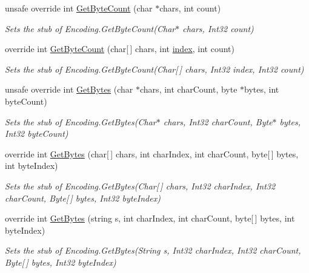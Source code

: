 \begin{DoxyCompactItemize}
unsafe override int \hyperlink{class_system_1_1_text_1_1_fakes_1_1_stub_encoding_a1a066dfd705dbee07eadc42558f04eb8}{Get\-Byte\-Count} (char $\ast$chars, int count)
\begin{DoxyCompactList}\small\item\em Sets the stub of Encoding.\-Get\-Byte\-Count(\-Char$\ast$ chars, Int32 count)\end{DoxyCompactList}\item 
override int \hyperlink{class_system_1_1_text_1_1_fakes_1_1_stub_encoding_a275fe54679a19c7c8ebd3a6cd57f48f8}{Get\-Byte\-Count} (char\mbox{[}$\,$\mbox{]} chars, int \hyperlink{jquery-1_810_82-vsdoc_8js_a75bb12d1f23302a9eea93a6d89d0193e}{index}, int count)
\begin{DoxyCompactList}\small\item\em Sets the stub of Encoding.\-Get\-Byte\-Count(\-Char\mbox{[}$\,$\mbox{]} chars, Int32 index, Int32 count)\end{DoxyCompactList}\item 
unsafe override int \hyperlink{class_system_1_1_text_1_1_fakes_1_1_stub_encoding_a7b315f05859702a62acb77530835ec33}{Get\-Bytes} (char $\ast$chars, int char\-Count, byte $\ast$bytes, int byte\-Count)
\begin{DoxyCompactList}\small\item\em Sets the stub of Encoding.\-Get\-Bytes(\-Char$\ast$ chars, Int32 char\-Count, Byte$\ast$ bytes, Int32 byte\-Count)\end{DoxyCompactList}\item 
override int \hyperlink{class_system_1_1_text_1_1_fakes_1_1_stub_encoding_ab6dacd6494fe6c78fcd3c92e86b48380}{Get\-Bytes} (char\mbox{[}$\,$\mbox{]} chars, int char\-Index, int char\-Count, byte\mbox{[}$\,$\mbox{]} bytes, int byte\-Index)
\begin{DoxyCompactList}\small\item\em Sets the stub of Encoding.\-Get\-Bytes(\-Char\mbox{[}$\,$\mbox{]} chars, Int32 char\-Index, Int32 char\-Count, Byte\mbox{[}$\,$\mbox{]} bytes, Int32 byte\-Index)\end{DoxyCompactList}\item 
override int \hyperlink{class_system_1_1_text_1_1_fakes_1_1_stub_encoding_ab04747b1bf0dd1818f380b5d890ff92b}{Get\-Bytes} (string s, int char\-Index, int char\-Count, byte\mbox{[}$\,$\mbox{]} bytes, int byte\-Index)
\begin{DoxyCompactList}\small\item\em Sets the stub of Encoding.\-Get\-Bytes(\-String s, Int32 char\-Index, Int32 char\-Count, Byte\mbox{[}$\,$\mbox{]} bytes, Int32 byte\-Index)\end{DoxyCompactList}\item 

\end{DoxyCompactItemize}
